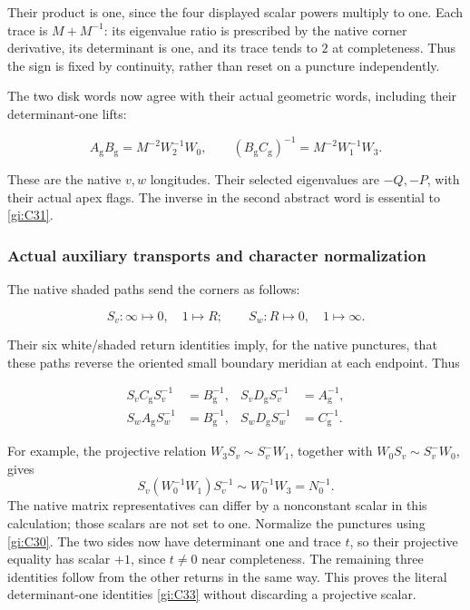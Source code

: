 Their product is one, since the four displayed scalar powers multiply to one. Each trace is \(M+M^{-1}\): its eigenvalue ratio is prescribed by the native corner derivative, its determinant is one, and its trace tends to \(2\) at completeness. Thus the sign is fixed by continuity, rather than reset on a puncture independently.

The two disk words now agree with their actual geometric words, including their determinant-one lifts:

\begin{equation}\label{gi:C31}
A_{\mathrm g}B_{\mathrm g}=M^{-2}W_2^{-1}W_0,\qquad
 (B_{\mathrm g}C_{\mathrm g})^{-1}
                         =M^{-2}W_1^{-1}W_3.
\end{equation}

These are the native \(v,w\) longitudes. Their selected eigenvalues are \(-Q,-P\), with their actual apex flags. The inverse in the second abstract word is essential to \eqref{gi:C31}.

\subsubsection{Actual auxiliary transports and character normalization}\label{gi:actual-auxiliary-transports-and-character-normalization}

The native shaded paths send the corners as follows:

\begin{equation}\label{gi:C32}
S_v:\infty\mapsto0,\quad 1\mapsto R;\qquad
 S_w:R\mapsto0,\quad 1\mapsto\infty.
\end{equation}

Their six white/shaded return identities imply, for the native punctures, that these paths reverse the oriented small boundary meridian at each endpoint. Thus

\begin{equation}\label{gi:C33}
\begin{aligned}
 S_vC_{\mathrm g}S_v^{-1}&=B_{\mathrm g}^{-1},
 &S_vD_{\mathrm g}S_v^{-1}&=A_{\mathrm g}^{-1},\\
 S_wA_{\mathrm g}S_w^{-1}&=B_{\mathrm g}^{-1},
 &S_wD_{\mathrm g}S_w^{-1}&=C_{\mathrm g}^{-1}.
 \end{aligned}
\end{equation}

For example, the projective relation \(W_3S_v\sim S_v^-W_1\), together with
\(W_0S_v\sim S_v^-W_0\), gives
\[
 S_v(W_0^{-1}W_1)S_v^{-1}\sim W_0^{-1}W_3=N_0^{-1}.
\]
The native matrix representatives can differ by a nonconstant scalar in this calculation; those scalars are not set to one. Normalize the punctures using \eqref{gi:C30}. The two sides now have determinant one and trace \(t\), so their projective equality has scalar \(+1\), since \(t\ne0\) near completeness. The remaining three identities follow from the other returns in the same way. This proves the literal determinant-one identities \eqref{gi:C33} without discarding a projective scalar.


